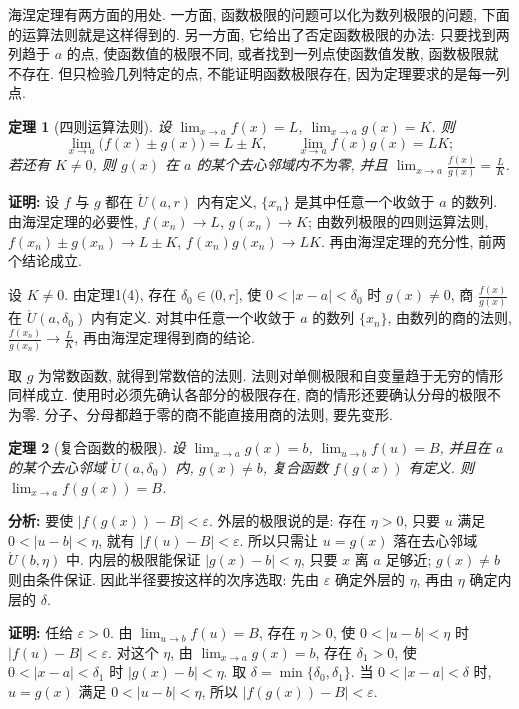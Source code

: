 \documentclass[UTF8,openany]{ctexbook}
\theoremstyle{chinesetextbook}
\newtheorem{theorem}{定理}[section]
\newenvironment{cnproof}{\par\indent\textbf{证明:} \ignorespaces}{\par}
\begin{document}
海涅定理有两方面的用处. 一方面, 函数极限的问题可以化为数列极限的问题, 下面的运算法则就是这样得到的. 另一方面, 它给出了否定函数极限的办法: 只要找到两列趋于 $a$ 的点, 使函数值的极限不同, 或者找到一列点使函数值发散, 函数极限就不存在. 但只检验几列特定的点, 不能证明函数极限存在, 因为定理要求的是每一列点.
\begin{theorem}[四则运算法则]
设 $\displaystyle\lim_{x\to a}f(x)=L$, $\displaystyle\lim_{x\to a}g(x)=K$. 则
\[
\lim_{x\to a}\bigl(f(x)\pm g(x)\bigr)=L\pm K,\qquad\lim_{x\to a}f(x)g(x)=LK;
\]
若还有 $K\ne0$, 则 $g(x)$ 在 $a$ 的某个去心邻域内不为零, 并且 $\displaystyle\lim_{x\to a}\frac{f(x)}{g(x)}=\frac LK$.
\end{theorem}
\begin{cnproof}
设 $f$ 与 $g$ 都在 $\mathring U(a,r)$ 内有定义, $\{x_n\}$ 是其中任意一个收敛于 $a$ 的数列. 由海涅定理的必要性, $f(x_n)\to L$, $g(x_n)\to K$; 由数列极限的四则运算法则, $f(x_n)\pm g(x_n)\to L\pm K$, $f(x_n)g(x_n)\to LK$. 再由海涅定理的充分性, 前两个结论成立.

设 $K\ne0$. 由定理1(4), 存在 $\delta_0\in(0,r]$, 使 $0<|x-a|<\delta_0$ 时 $g(x)\ne0$, 商 $\displaystyle\frac{f(x)}{g(x)}$ 在 $\mathring U(a,\delta_0)$ 内有定义. 对其中任意一个收敛于 $a$ 的数列 $\{x_n\}$, 由数列的商的法则, $\displaystyle\frac{f(x_n)}{g(x_n)}\to\frac LK$, 再由海涅定理得到商的结论.
\end{cnproof}
取 $g$ 为常数函数, 就得到常数倍的法则. 法则对单侧极限和自变量趋于无穷的情形同样成立. 使用时必须先确认各部分的极限存在, 商的情形还要确认分母的极限不为零. 分子、分母都趋于零的商不能直接用商的法则, 要先变形.
\begin{theorem}[复合函数的极限]
设 $\displaystyle\lim_{x\to a}g(x)=b$, $\displaystyle\lim_{u\to b}f(u)=B$, 并且在 $a$ 的某个去心邻域 $\mathring U(a,\delta_0)$ 内, $g(x)\ne b$, 复合函数 $f(g(x))$ 有定义. 则 $\displaystyle\lim_{x\to a}f(g(x))=B$.
\end{theorem}
\par\indent\textbf{分析:} 要使 $|f(g(x))-B|<\varepsilon$. 外层的极限说的是: 存在 $\eta>0$, 只要 $u$ 满足 $0<|u-b|<\eta$, 就有 $|f(u)-B|<\varepsilon$. 所以只需让 $u=g(x)$ 落在去心邻域 $\mathring U(b,\eta)$ 中. 内层的极限能保证 $|g(x)-b|<\eta$, 只要 $x$ 离 $a$ 足够近; $g(x)\ne b$ 则由条件保证. 因此半径要按这样的次序选取: 先由 $\varepsilon$ 确定外层的 $\eta$, 再由 $\eta$ 确定内层的 $\delta$.
\begin{cnproof}
任给 $\varepsilon>0$. 由 $\displaystyle\lim_{u\to b}f(u)=B$, 存在 $\eta>0$, 使 $0<|u-b|<\eta$ 时 $|f(u)-B|<\varepsilon$. 对这个 $\eta$, 由 $\displaystyle\lim_{x\to a}g(x)=b$, 存在 $\delta_1>0$, 使 $0<|x-a|<\delta_1$ 时 $|g(x)-b|<\eta$. 取 $\delta=\min\{\delta_0,\delta_1\}$. 当 $0<|x-a|<\delta$ 时, $u=g(x)$ 满足 $0<|u-b|<\eta$, 所以 $|f(g(x))-B|<\varepsilon$.
\end{cnproof}
\end{document}
